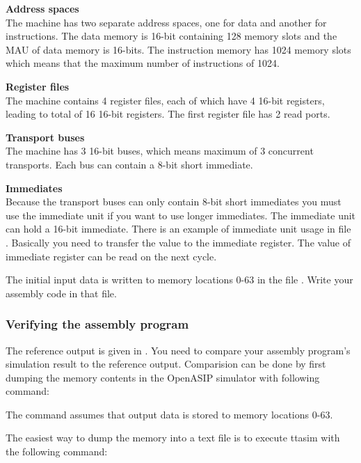 \documentclass[a4paper,twoside]{tceusermanual}
\begin{document}
\textbf{Address spaces} \\
The machine has two separate address spaces, one for data and another for
instructions. The data memory is 16-bit containing 128 memory slots and the
MAU of data memory is 16-bits. The instruction memory has 1024 memory slots
which means that the maximum number of instructions of 1024.

\textbf{Register files} \\
The machine contains 4 register files, each of which have 4 16-bit registers,
leading to total of 16 16-bit registers.  The first register file
has 2 read ports.

\textbf{Transport buses} \\
The machine has 3 16-bit buses, which means maximum of 3 concurrent
transports. Each bus can contain a 8-bit short immediate.

\textbf{Immediates} \\
Because the transport buses can only contain 8-bit short immediates you must
use the immediate unit if you want to use longer immediates. The immediate unit
can hold a 16-bit immediate. There is an example of immediate unit usage in
file . Basically you need to transfer the value to the
immediate register. The value of immediate register can be read on the next
cycle.

The initial input data is written to memory locations 0-63 in the file
. Write your assembly code in that file.

\subsubsection{Verifying the assembly program}

The reference output is given in . You need to
compare your assembly program's simulation result to the reference
output. Comparision can be done by first dumping the memory contents in the
OpenASIP simulator with following command:


The command assumes that output data is stored to memory locations 0-63.

The easiest way to dump the memory into a text file is to execute ttasim with
the following command:

\end{document}

